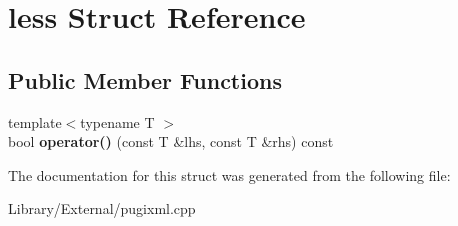 \hypertarget{structless}{}\section{less Struct Reference}
\label{structless}
\subsection*{Public Member Functions}
\begin{DoxyCompactItemize}
\item 
\hypertarget{structless_ad467675b44baab18215475c7cba0cb48}{}{\footnotesize template$<$typename T $>$ }\\bool {\bfseries operator()} (const T \&lhs, const T \&rhs) const \label{structless_ad467675b44baab18215475c7cba0cb48}

\end{DoxyCompactItemize}


The documentation for this struct was generated from the following file\+:\begin{DoxyCompactItemize}
\item 
Library/\+External/pugixml.\+cpp\end{DoxyCompactItemize}
